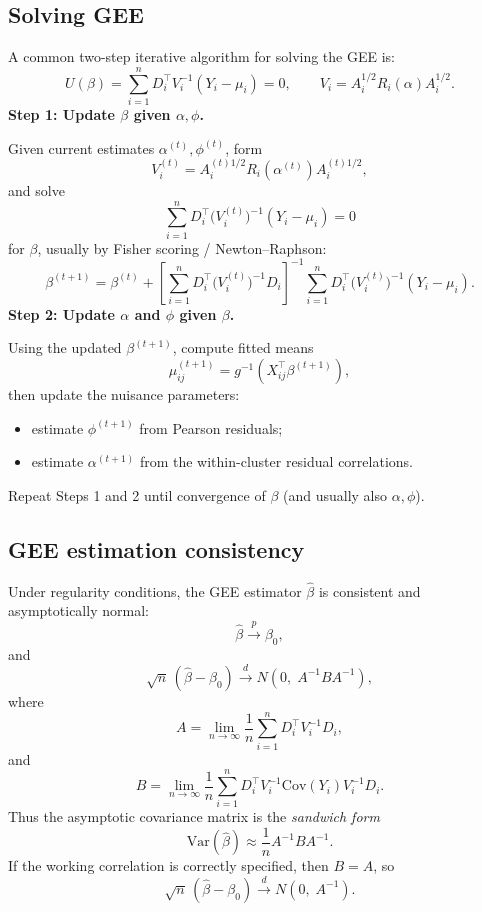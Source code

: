 \documentclass[11pt]{article}
\theoremstyle{definition}
\begin{document}
\subsection{Solving GEE}
A common two-step iterative algorithm for solving the GEE is:
\[
U(\beta)
=
\sum_{i=1}^n D_i^\top V_i^{-1}(Y_i-\mu_i)=0,
\qquad
V_i=A_i^{1/2}R_i(\alpha)A_i^{1/2}.
\]
\textbf{Step 1: Update \(\beta\) given \(\alpha,\phi\).}  

Given current estimates \(\alpha^{(t)},\phi^{(t)}\), form
\[
V_i^{(t)}=A_i^{(t)1/2}R_i\!\left(\alpha^{(t)}\right)A_i^{(t)1/2},
\]
and solve
\[
\sum_{i=1}^n D_i^\top \bigl(V_i^{(t)}\bigr)^{-1}(Y_i-\mu_i)=0
\]
for \(\beta\), usually by Fisher scoring / Newton--Raphson:
\[
\beta^{(t+1)}
=
\beta^{(t)}
+
\left[
\sum_{i=1}^n D_i^\top \bigl(V_i^{(t)}\bigr)^{-1} D_i
\right]^{-1}
\sum_{i=1}^n D_i^\top \bigl(V_i^{(t)}\bigr)^{-1}(Y_i-\mu_i).
\]
\textbf{Step 2: Update \(\alpha\) and \(\phi\) given \(\beta\).}  

Using the updated \(\beta^{(t+1)}\), compute fitted means
\[
\mu_{ij}^{(t+1)}=g^{-1}(X_{ij}^\top \beta^{(t+1)}),
\]
then update the nuisance parameters:
\begin{itemize}
\item estimate \(\phi^{(t+1)}\) from Pearson residuals;
\item estimate \(\alpha^{(t+1)}\) from the within-cluster residual correlations.
\end{itemize}
Repeat Steps 1 and 2 until convergence of \(\beta\) (and usually also \(\alpha,\phi\)).
\subsection*{GEE estimation consistency}
Under regularity conditions, the GEE estimator \(\hat\beta\) is consistent and asymptotically normal:
\[
\hat\beta \xrightarrow{p} \beta_0,
\]
and
\[
\sqrt{n}\,(\hat\beta-\beta_0)
\xrightarrow{d}
N\!\left(0,\; A^{-1} B A^{-1}\right),
\]
where
\[
A
=
\lim_{n\to\infty}
\frac{1}{n}
\sum_{i=1}^n
D_i^\top V_i^{-1} D_i,
\]
and
\[
B
=
\lim_{n\to\infty}
\frac{1}{n}
\sum_{i=1}^n
D_i^\top V_i^{-1}
\mathrm{Cov}(Y_i)
V_i^{-1} D_i.
\]
Thus the asymptotic covariance matrix is the \emph{sandwich form}
\[
\mathrm{Var}(\hat\beta)
\approx
\frac{1}{n}A^{-1}BA^{-1}.
\]
If the working correlation is correctly specified, then \(B=A\), so
\[
\sqrt{n}\,(\hat\beta-\beta_0)
\xrightarrow{d}
N\!\left(0,\; A^{-1}\right).
\]
\end{document}

